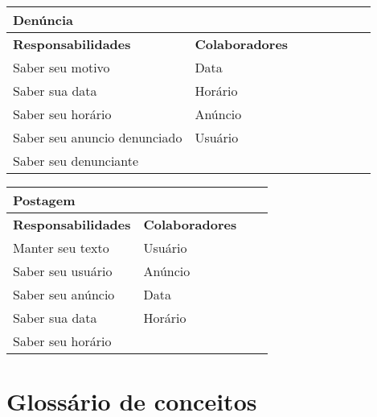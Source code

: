 \documentclass{article}
\begin{document}
    
    \begin{center}
   	 \begin{tabular}{|p{0.5\linewidth}|p{0.5\linewidth}|}
\hline
 	\multicolumn{2}{|p{\textwidth}|}{
{\large \textbf{Denúncia}}
}  \\
\hline
\textbf{Responsabilidades} & \textbf{Colaboradores} \\ 
\hline
  	Saber seu motivo &  Data \\
  	\hline
  	Saber sua data &  Horário \\
  	\hline
  	Saber seu horário &  Anúncio \\
  	\hline
  	Saber seu anuncio denunciado & Usuário \\
  	\hline
  	Saber seu denunciante &  \\
  	\hline
   	\end{tabular} 
    \end{center}
    
    
\begin{center}
 \begin{tabular}{|p{0.5\linewidth}|p{0.5\linewidth}|}
  \hline
  \multicolumn{2}{|p{\textwidth}|}{
   {\large \textbf{Postagem}}} \\
  \hline
  \textbf{Responsabilidades} & \textbf{Colaboradores} \\ 
  \hline
  Manter seu texto &  Usuário \\
  \hline
  Saber seu usuário & Anúncio \\
  \hline
  Saber seu anúncio & Data \\
  \hline
  Saber sua data & Horário \\
  \hline
  Saber seu horário &  \\
  \hline
 
 \end{tabular} 
\end{center}
    
\section{Glossário de conceitos}
    
\end{document}
